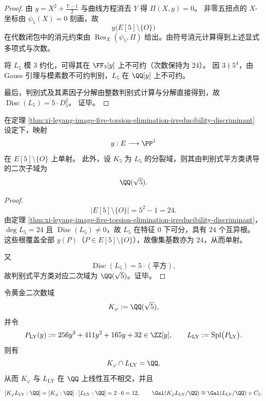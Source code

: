 \begin{proof}
由 \(y=X^2+\frac{Y-1}{2}\) 与曲线方程消去 \(Y\) 得 \(\Pi(X,y)=0\)。
非零五扭点的 \(X\)-坐标由 \(\psi_5(X)=0\) 刻画，故
\[
y\bigl(E[5]\setminus\{O\}\bigr)
\]
在代数闭包中的消元约束由
\(
\operatorname{Res}_X(\psi_5,\Pi)
\)
给出。由符号消元计算得到上述显式多项式与次数。

将 \(L_5\) 模 \(3\) 约化，可得其在 \(\FF_3[y]\) 上不可约（次数保持为 \(24\)）。
因 \(3\nmid 5^4\)，由 Gauss 引理与模素数不可约判别，\(L_5\) 在 \(\QQ[y]\) 上不可约。

最后，判别式及其素因子分解由整数判别式计算与分解直接得到，故
\(
\operatorname{Disc}(L_5)=5\cdot D_5^2
\)。
证毕。
\end{proof}

\begin{proposition}[五扭点像的分离性与二次分解域]\label{prop:xi-leyang-image-five-torsion-separation-quadratic-field}
在定理 \ref{thm:xi-leyang-image-five-torsion-elimination-irreducibility-discriminant} 设定下，映射
\[
y:E\longrightarrow \PP^1
\]
在 \(E[5]\setminus\{O\}\) 上单射。
此外，设 \(K_5\) 为 \(L_5\) 的分裂域，则其由判别式平方类诱导的二次子域为
\[
\QQ(\sqrt{5}).
\]
\end{proposition}
\begin{proof}
\[
|E[5]\setminus\{O\}|=5^2-1=24.
\]
由定理 \ref{thm:xi-leyang-image-five-torsion-elimination-irreducibility-discriminant}，\(\deg L_5=24\) 且 \(\operatorname{Disc}(L_5)\neq 0\)，故 \(L_5\) 在特征 \(0\) 下可分，具有 \(24\) 个互异根。
这些根覆盖全部 \(y(P)\)（\(P\in E[5]\setminus\{O\}\)），故像集基数亦为 \(24\)，从而单射。

又
\[
\operatorname{Disc}(L_5)=5\cdot(\text{平方}),
\]
故判别式平方类对应二次域为 \(\QQ(\sqrt{5})\)。证毕。
\end{proof}

\begin{theorem}\label{thm:xi-sqrt5-axis-leyang-cubic-linear-disjoint}
令黄金二次数域
\[
K_\varphi:=\QQ(\sqrt{5}),
\]
并令
\[
P_{\mathrm{LY}}(y):=256y^{3}+411y^{2}+165y+32\in\ZZ[y],
\qquad
L_{\mathrm{LY}}:=\mathrm{Spl}\bigl(P_{\mathrm{LY}}\bigr).
\]
则有
\[
K_\varphi\cap L_{\mathrm{LY}}=\QQ,
\]
从而 \(K_\varphi\) 与 \(L_{\mathrm{LY}}\) 在 \(\QQ\) 上线性互不相交，并且
\[
[K_\varphi L_{\mathrm{LY}}:\QQ]=[K_\varphi:\QQ]\cdot[L_{\mathrm{LY}}:\QQ]=2\cdot 6=12,
\qquad
\Gal(K_\varphi L_{\mathrm{LY}}/\QQ)\cong \Gal(L_{\mathrm{LY}}/\QQ)\times C_2.
\]
\end{theorem}

